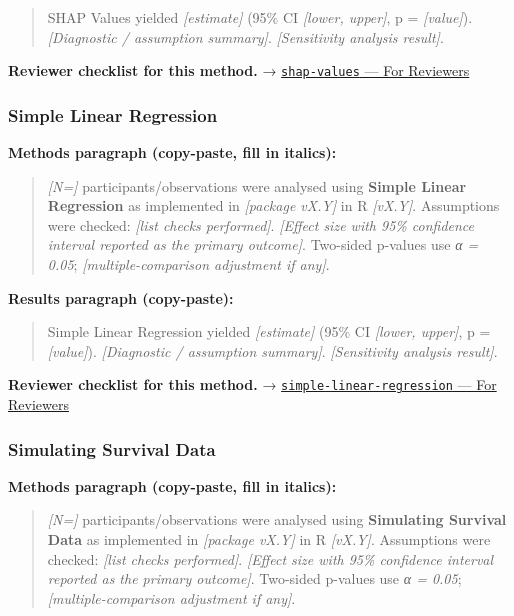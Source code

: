 \documentclass[
]{article}
\begin{document}
\begin{quote}
SHAP Values yielded \emph{{[}estimate{]}} (95\% CI \emph{{[}lower,
upper{]}}, p = \emph{{[}value{]}}). \emph{{[}Diagnostic / assumption
summary{]}}. \emph{{[}Sensitivity analysis result{]}}.
\end{quote}

\textbf{Reviewer checklist for this method.} →
\href{../chapters/13-ml/shap-values.Rmd\#for-reviewers}{\texttt{shap-values}
--- For Reviewers}

\subsubsection{Simple Linear Regression}\label{simple-linear-regression}

\textbf{Methods paragraph (copy-paste, fill in italics):}

\begin{quote}
\emph{{[}N={]}} participants/observations were analysed using
\textbf{Simple Linear Regression} as implemented in \emph{{[}package
vX.Y{]}} in R \emph{{[}vX.Y{]}}. Assumptions were checked: \emph{{[}list
checks performed{]}}. \emph{{[}Effect size with 95\% confidence interval
reported as the primary outcome{]}}. Two-sided p-values use \emph{α =
0.05}; \emph{{[}multiple-comparison adjustment if any{]}}.
\end{quote}

\textbf{Results paragraph (copy-paste):}

\begin{quote}
Simple Linear Regression yielded \emph{{[}estimate{]}} (95\% CI
\emph{{[}lower, upper{]}}, p = \emph{{[}value{]}}). \emph{{[}Diagnostic
/ assumption summary{]}}. \emph{{[}Sensitivity analysis result{]}}.
\end{quote}

\textbf{Reviewer checklist for this method.} →
\href{../chapters/07-regression/simple-linear-regression.Rmd\#for-reviewers}{\texttt{simple-linear-regression}
--- For Reviewers}

\subsubsection{Simulating Survival Data}\label{simulating-survival-data}

\textbf{Methods paragraph (copy-paste, fill in italics):}

\begin{quote}
\emph{{[}N={]}} participants/observations were analysed using
\textbf{Simulating Survival Data} as implemented in \emph{{[}package
vX.Y{]}} in R \emph{{[}vX.Y{]}}. Assumptions were checked: \emph{{[}list
checks performed{]}}. \emph{{[}Effect size with 95\% confidence interval
reported as the primary outcome{]}}. Two-sided p-values use \emph{α =
0.05}; \emph{{[}multiple-comparison adjustment if any{]}}.
\end{quote}
\end{document}
